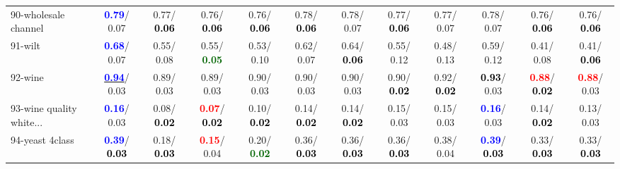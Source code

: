 \begin{table}[h]
\begin{center}
{\begin{tabular}{lc|c|c|c|c|c|c|c|c|c|c}
90-wholesale channel & \textcolor{blue}{\textbf{  0.79}}/  0.07 &   0.77/\textcolor{black}{\textbf{  0.06}} &   0.76/\textcolor{black}{\textbf{  0.06}} &   0.76/\textcolor{black}{\textbf{  0.06}} &   0.78/\textcolor{black}{\textbf{  0.06}} &   0.78/  0.07 &   0.77/\textcolor{black}{\textbf{  0.06}} &   0.77/  0.07 &   0.78/  0.07 &   0.76/\textcolor{black}{\textbf{  0.06}} &   0.76/\textcolor{black}{\textbf{  0.06}} \\
91-wilt & \textcolor{blue}{\textbf{  0.68}}/  0.07 &   0.55/  0.08 &   0.55/\textcolor{darkgreen}{\textbf{  0.05}} &   0.53/  0.10 &   0.62/  0.07 &   0.64/\textcolor{black}{\textbf{  0.06}} &   0.55/  0.12 &   0.48/  0.13 &   0.59/  0.12 &   0.41/  0.08 &   0.41/\textcolor{black}{\textbf{  0.06}} \\
92-wine & \underline{\textcolor{blue}{\textbf{  0.94}}}/  0.03 &   0.89/  0.03 &   0.89/  0.03 &   0.90/  0.03 &   0.90/  0.03 &   0.90/  0.03 &   0.90/\textcolor{black}{\textbf{  0.02}} &   0.92/\textcolor{black}{\textbf{  0.02}} & \textcolor{black}{\textbf{  0.93}}/  0.03 & \textcolor{red}{\textbf{  0.88}}/\textcolor{black}{\textbf{  0.02}} & \textcolor{red}{\textbf{  0.88}}/  0.03 \\ \hline
93-wine quality white... & \textcolor{blue}{\textbf{  0.16}}/  0.03 &   0.08/\textcolor{black}{\textbf{  0.02}} & \textcolor{red}{\textbf{  0.07}}/\textcolor{black}{\textbf{  0.02}} &   0.10/\textcolor{black}{\textbf{  0.02}} &   0.14/\textcolor{black}{\textbf{  0.02}} &   0.14/\textcolor{black}{\textbf{  0.02}} &   0.15/  0.03 &   0.15/  0.03 & \textcolor{blue}{\textbf{  0.16}}/  0.03 &   0.14/\textcolor{black}{\textbf{  0.02}} &   0.13/  0.03 \\
94-yeast 4class & \textcolor{blue}{\textbf{  0.39}}/\textcolor{black}{\textbf{  0.03}} &   0.18/\textcolor{black}{\textbf{  0.03}} & \textcolor{red}{\textbf{  0.15}}/  0.04 &   0.20/\textcolor{darkgreen}{\textbf{  0.02}} &   0.36/\textcolor{black}{\textbf{  0.03}} &   0.36/\textcolor{black}{\textbf{  0.03}} &   0.36/\textcolor{black}{\textbf{  0.03}} &   0.38/  0.04 & \textcolor{blue}{\textbf{  0.39}}/\textcolor{black}{\textbf{  0.03}} &   0.33/\textcolor{black}{\textbf{  0.03}} &   0.33/\textcolor{black}{\textbf{  0.03}} \\\end{tabular}
}\label{strats2bRFw}
\end{center}
\end{table}
                                     
